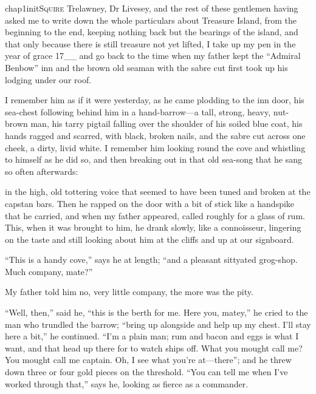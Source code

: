 

\lettrine[lines=4,image=true]{chap1initS}{quire} Trelawney, Dr Livesey, and the rest of these gentlemen having asked me to write down the whole particulars about Treasure Island, from the beginning to the end, keeping nothing back but the bearings of the island, and that only because there is still treasure not yet lifted, I take up my pen in the year of grace 17\_\_ and go back to the time when my father kept the \enquote{Admiral Benbow} inn and the brown old seaman with the sabre cut first took up his lodging under our roof.

I remember him as if it were yesterday, as he came plodding to the inn door, his sea-chest following behind him in a hand-barrow---a tall, strong, heavy, nut-brown man, his tarry pigtail falling over the shoulder of his soiled blue coat, his hands ragged and scarred, with black, broken nails, and the sabre cut across one cheek, a dirty, livid white. I remember him looking round the cove and whistling to himself as he did so, and then breaking out in that old sea-song that he sang so often afterwards:

\shortyoho

in the high, old tottering voice that seemed to have been tuned and broken at the capstan bars. Then he rapped on the door with a bit of stick like a handspike that he carried, and when my father appeared, called roughly for a glass of rum. This, when it was brought to him, he drank slowly, like a connoisseur, lingering on the taste and still looking about him at the cliffs and up at our signboard.

\enquote{This is a handy cove,} says he at length; \enquote{and a pleasant sittyated grog-shop. Much company, mate?}

My father told him no, very little company, the more was the pity.

\enquote{Well, then,} said he, \enquote{this is the berth for me. Here you, matey,} he cried to the man who trundled the barrow; \enquote{bring up alongside and help up my chest. I’ll stay here a bit,} he continued. \enquote{I’m a plain man; rum and bacon and eggs is what I want, and that head up there for to watch ships off. What you mought call me? You mought call me captain. Oh, I see what you’re at---there}; and he threw down three or four gold pieces on the threshold. \enquote{You can tell me when I’ve worked through that,} says he, looking as fierce as a commander.

